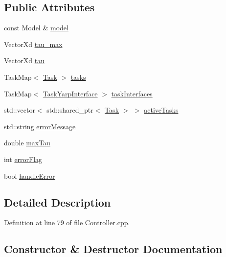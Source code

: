 \subsection*{Public Attributes}
\begin{DoxyCompactItemize}
\item 
const Model \& \hyperlink{structocra_1_1Controller_1_1Pimpl_aadf5eccdc9453d1f277f62b7becf7390}{model}
\item 
Vector\+Xd \hyperlink{structocra_1_1Controller_1_1Pimpl_a19486bfe59a11231eeabfd3b2b9abd39}{tau\+\_\+max}
\item 
Vector\+Xd \hyperlink{structocra_1_1Controller_1_1Pimpl_a06e7fceb4a0a3c678a4e26fc12946e5c}{tau}
\item 
Task\+Map$<$ \hyperlink{classocra_1_1Task}{Task} $>$ \hyperlink{structocra_1_1Controller_1_1Pimpl_a246fa1cc15ad20293ef78b04dc0dbe70}{tasks}
\item 
Task\+Map$<$ \hyperlink{classocra_1_1TaskYarpInterface}{Task\+Yarp\+Interface} $>$ \hyperlink{structocra_1_1Controller_1_1Pimpl_a396836991948d8d90cf5852330d2c5c3}{task\+Interfaces}
\item 
std\+::vector$<$ std\+::shared\+\_\+ptr$<$ \hyperlink{classocra_1_1Task}{Task} $>$ $>$ \hyperlink{structocra_1_1Controller_1_1Pimpl_a721a40c7b21e230a7508995ecfa93d60}{active\+Tasks}
\item 
std\+::string \hyperlink{structocra_1_1Controller_1_1Pimpl_a1150a44bd413ec025703d53c8eaf4733}{error\+Message}
\item 
double \hyperlink{structocra_1_1Controller_1_1Pimpl_a6731e905858ef90305a3c99c605c8069}{max\+Tau}
\item 
int \hyperlink{structocra_1_1Controller_1_1Pimpl_a8a4ac972687499a277fa08dced73180c}{error\+Flag}
\item 
bool \hyperlink{structocra_1_1Controller_1_1Pimpl_a2764f0bf903a983abae8195ab6639ed5}{handle\+Error}
\end{DoxyCompactItemize}


\subsection{Detailed Description}


Definition at line 79 of file Controller.\+cpp.



\subsection{Constructor \& Destructor Documentation}
\hypertarget{structocra_1_1Controller_1_1Pimpl_ad59ee786ca8b100a87e797cdfc6c15f5}{}\label{structocra_1_1Controller_1_1Pimpl_ad59ee786ca8b100a87e797cdfc6c15f5} 
